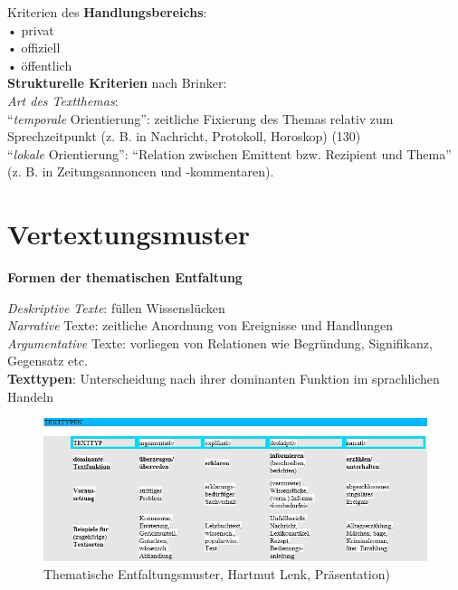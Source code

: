 \documentclass[
  letterpaper,
]{scrbook}
\begin{document}
Kriterien des \textbf{Handlungsbereichs}:\\
• privat\\
• offiziell\\
• öffentlich\\

\textbf{Strukturelle Kriterien} nach Brinker:\\
\emph{Art des Textthemas}:\\
``\emph{temporale} Orientierung'': zeitliche Fixierung des Themas
relativ zum Sprechzeitpunkt (z. B. in Nachricht, Protokoll, Horoskop)
(130)\\
``\emph{lokale} Orientierung'': ``Relation zwischen Emittent bzw.
Rezipient und Thema'' (z. B. in Zeitungsannoncen und -kommentaren).\\

\hypertarget{vertextungsmuster}{%
\section{Vertextungsmuster}\label{vertextungsmuster}}

\textbf{Formen der thematischen Entfaltung}

\emph{Deskriptive Texte}: füllen Wissenslücken\\
\emph{Narrative} Texte: zeitliche Anordnung von Ereignisse und
Handlungen\\
\emph{Argumentative} Texte: vorliegen von Relationen wie Begründung,
Signifikanz, Gegensatz etc.\\

\textbf{Texttypen}: Unterscheidung nach ihrer dominanten Funktion im
sprachlichen Handeln\\

\begin{figure}

{\centering \includegraphics[width=1\textwidth,height=\textheight]{./pictures/thematische_entfaltung.jpg}

}

\caption{Thematische Entfaltungsmuster, Hartmut Lenk, Präsentation)}

\end{figure}
\end{document}

